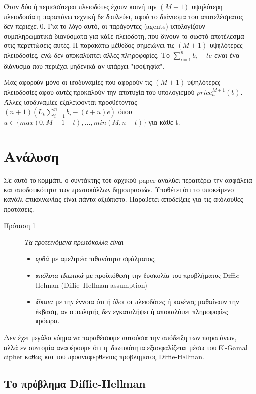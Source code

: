 \documentclass[letterpaper,11pt]{article}
\begin{document}
Όταν δύο ή περισσότεροι πλειοδότες έχουν κοινή την $(M + 1)$ υψηλότερη πλειοδοσία η παραπάνω τεχνική δε δουλεύει, αφού το διάνυσμα του
αποτελέσματος δεν περιέχει 0. Για το λόγο αυτό, οι παράγοντες (agents) υπολογίζουν συμπληρωματικά διανύσματα για κάθε πλειοδότη, που δίνουν το
σωστό αποτέλεσμα στις περιπτώσεις αυτές. Η παρακάτω μέθοδος σημειώνει τις $(M + 1)$ υψηλότερες πλειοδοσίες, ενώ δεν αποκαλύπτει άλλες πληροφορίες.
Το $\sum_{i=1}^{n}{b_i-te}$ είναι ένα διάνυσμα που περιέχει μηδενικά αν υπάρχει "ισοψηφία".

Μας αφορούν μόνο οι ισοδυναμίες που αφορούν τις $(M + 1)$ υψηλότερες πλειοδοσίες αφού αυτές προκαλούν την αποτυχία του υπολογισμού 
$price_{a}^{M+1}(b)$. Άλλες ισοδυναμίες εξαλείφονται προσθέτοντας \\ $(n+1)\left ( L_k \sum_{i=1}^{n} b_i - (t+u)e \right )$ όπου 
$u \in \{ max(0, M + 1 − t),..., min(M, n − t)\}$ για κάθε t.


\section{Ανάλυση}

Σε αυτό το κομμάτι, ο συντάκτης του αρχικού paper αναλύει περαιτέρω την ασφάλεια και αποδοτικότητα των πρωτοκόλλων δημοπρασιών. Υποθέτει ότι το
υποκείμενο κανάλι επικοινωνίας είναι πάντα αξιόπιστο. Παραθέτει αποδείξεις για τις ακόλουθες προτάσεις.

\begin{description}
	\item[Πρόταση 1] \emph{Τα προτεινόμενα πρωτόκολλα είναι}
		\begin{itemize}
			\item \emph{ορθά} με αμελητέα πιθανότητα σφάλματος,
			\item \emph{απόλυτα ιδιωτικά} με προϋπόθεση την δυσκολία του προβλήματος Diffie-Helman (Diffie–Hellman assumption) 
			\item \emph{δίκαια} με την έννοια ότι ή όλοι οι πλειοδότες ή κανένας μαθαίνουν την έκβαση, αν ο πωλητής δεν εγκαταλήψει ή αποκαλύψει
			πληροφορίες πρόωρα.
		\end{itemize}
\end{description}

Δεν έχει μεγάλο νόημα να παραθέσουμε αυτούσια την απόδειξη των παραπάνων, αλλά εν συντομία αναφέρουμε ότι η ιδιωτικότητα εξασφαλίζεται μέσω του
El-Gamal cipher καθώς και του προαναφερθέντος προβλήματος Diffie-Hellman.

\subsection{Το πρόβλημα Diffie-Hellman}
\end{document}
